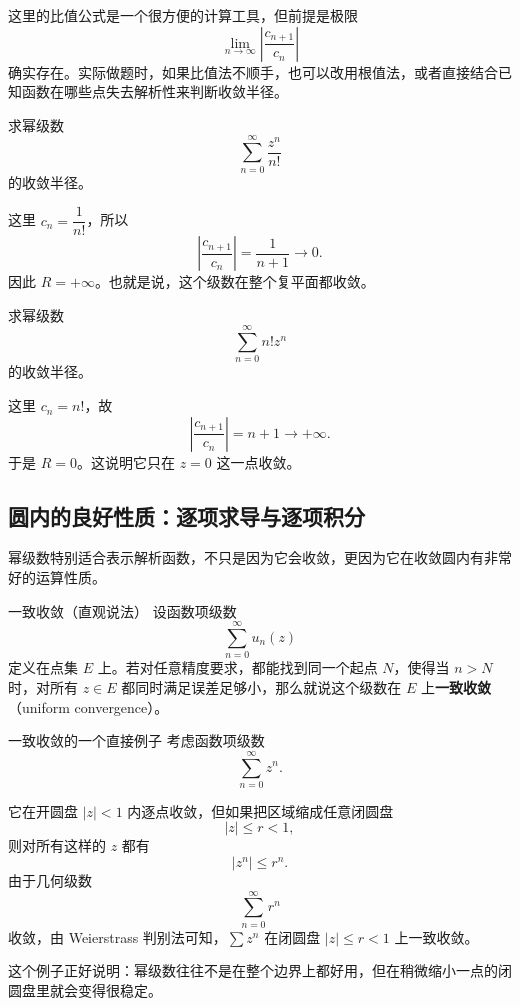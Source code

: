 \begin{zhu}{}{}
这里的比值公式是一个很方便的计算工具，但前提是极限
\[
    \lim_{n\to\infty}\left|\frac{c_{n+1}}{c_n}\right|
\]
确实存在。实际做题时，如果比值法不顺手，也可以改用根值法，或者直接结合已知函数在哪些点失去解析性来判断收敛半径。
\end{zhu}

\begin{lizi}{}{}
求幂级数
\[
    \sum_{n=0}^{\infty} \frac{z^n}{n!}
\]
的收敛半径。

\begin{jie}
这里 $c_n=\dfrac{1}{n!}$，所以
\[
    \left|\frac{c_{n+1}}{c_n}\right|
    = \frac{1}{n+1}\to 0.
\]
因此 $R=+\infty$。也就是说，这个级数在整个复平面都收敛。
\end{jie}
\end{lizi}

\begin{lizi}{}{}
求幂级数
\[
    \sum_{n=0}^{\infty} n! z^n
\]
的收敛半径。

\begin{jie}
这里 $c_n=n!$，故
\[
    \left|\frac{c_{n+1}}{c_n}\right| = n+1 \to +\infty.
\]
于是 $R=0$。这说明它只在 $z=0$ 这一点收敛。
\end{jie}
\end{lizi}

\subsection{圆内的良好性质：逐项求导与逐项积分}

幂级数特别适合表示解析函数，不只是因为它会收敛，更因为它在收敛圆内有非常好的运算性质。

\begin{dingliyi}{一致收敛（直观说法）}{}
设函数项级数
\[
    \sum_{n=0}^{\infty} u_n(z)
\]
定义在点集 $E$ 上。若对任意精度要求，都能找到同一个起点 $N$，使得当 $n>N$ 时，对所有 $z\in E$ 都同时满足误差足够小，那么就说这个级数在 $E$ 上\textbf{一致收敛}（uniform convergence）。
\end{dingliyi}

\begin{lizi}{一致收敛的一个直接例子}{}
考虑函数项级数
\[
    \sum_{n=0}^{\infty} z^n.
\]
\begin{jie}
它在开圆盘 $|z|<1$ 内逐点收敛，但如果把区域缩成任意闭圆盘
\[
    |z|\le r<1,
\]
则对所有这样的 $z$ 都有
\[
    |z^n|\le r^n.
\]
由于几何级数
\[
    \sum_{n=0}^{\infty} r^n
\]
收敛，由 Weierstrass 判别法可知，$\sum z^n$ 在闭圆盘 $|z|\le r<1$ 上一致收敛。

这个例子正好说明：幂级数往往不是在整个边界上都好用，但在稍微缩小一点的闭圆盘里就会变得很稳定。
\end{jie}
\end{lizi}

